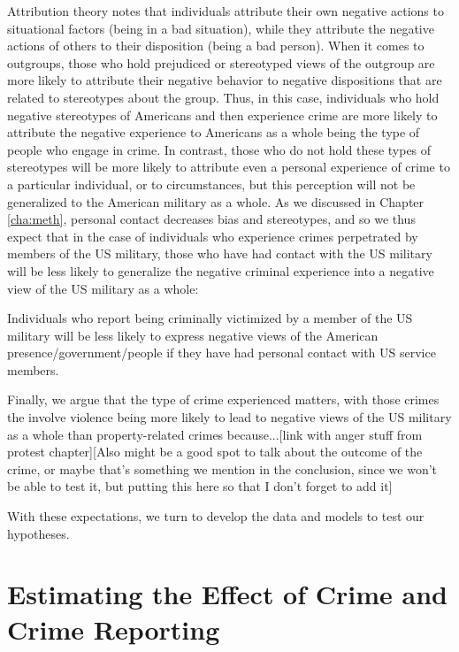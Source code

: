 Attribution theory notes that individuals attribute their own negative actions to situational factors (being in a bad situation), while they attribute the negative actions of others to their disposition (being a bad person).\cite{Jones1987} When it comes to outgroups, those who hold prejudiced or stereotyped views of the outgroup are more likely to attribute their negative behavior to negative dispositions that are related to stereotypes about the group.\cite{Hewstone1985,Heradstveit1996} Thus, in this case, individuals who hold negative stereotypes of Americans and then experience crime are more likely to attribute the negative experience to Americans as a whole being the type of people who engage in crime. In contrast, those who do not hold these types of stereotypes will be more likely to attribute even a personal experience of crime to a particular individual, or to circumstances, but this perception will not be generalized to the American military as a whole. As we discussed in Chapter \ref{cha:meth}, personal contact decreases bias and stereotypes, and so we thus expect that in the case of individuals who experience crimes perpetrated by members of the US military, those who have had contact with the US military will be less likely to generalize the negative criminal experience into a negative view of the US military as a whole:

\begin{hyp}
	Individuals who report being criminally victimized by a member of the US military will be less likely to express negative views of the American presence/government/people if they have had personal contact with US service members. 
\end{hyp}

Finally, we argue that the type of crime experienced matters, with those crimes the involve violence being more likely to lead to negative views of the US military as a whole than property-related crimes because...[link with anger stuff from protest chapter][Also might be a good spot to talk about the outcome of the crime, or maybe that's something we mention in the conclusion, since we won't be able to test it, but putting this here so that I don't forget to add it]


With these expectations, we turn to develop the data and models to test our hypotheses.


\section*{Estimating the Effect of Crime and Crime Reporting}

